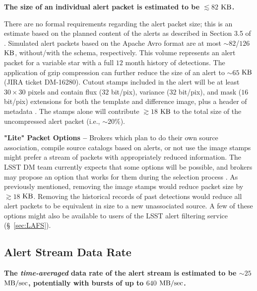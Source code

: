 \documentclass[DM,authoryear,toc]{lsstdoc}
\begin{document}
{\bf The size of an individual alert packet is estimated to be $\lesssim82$ $\rm KB$.}

There are no formal requirements regarding the alert packet size; this is an estimate based on the planned content of the alerts as described in Section 3.5 of . Simulated alert packets based on the Apache Avro format are at most $\sim82$/$126$ $\rm KB$, without/with the schema, respectively. This volume represents an alert packet for a variable star with a full $12$ month history of detections. 
The application of gzip compression can further reduce the size of an alert to $\sim65$ $\rm KB$ (JIRA ticket DM-16280). Cutout stamps included in the alert will be at least $30\times30$ pixels and contain flux ($32$ bit/pix), variance ($32$ bit/pix), and mask ($16$ bit/pix) extensions for both the template and difference image, plus a header of metadata . The stamps alone will contribute $\gtrsim18$ $\rm KB$ to the total size of the uncompressed alert packet (i.e., $\sim20\%$).

{\bf "Lite" Packet Options --} Brokers which plan to do their own source association, compile source catalogs based on alerts, or not use the image stamps might prefer a stream of packets with appropriately reduced information. The LSST DM team currently expects that some options will be possible, and brokers may propose an option that works for them during the selection process . As previously mentioned, removing the image stamps would reduce packet size by $\gtrsim18$ $\rm KB$. Removing the historical records of past detections would reduce all alert packets to be equivalent in size to a new unassociated source. A few of these options might also be available to users of the LSST alert filtering service (\S~\ref{sec:LAFS}). 


\subsection{Alert Stream Data Rate}\label{ssec:data_rate}

{\bf The {\it time-averaged} data rate of the alert stream is estimated to be $\sim25$ $\rm MB/sec$, potentially with bursts of up to $640$ $\rm MB/sec$.}
\end{document}
